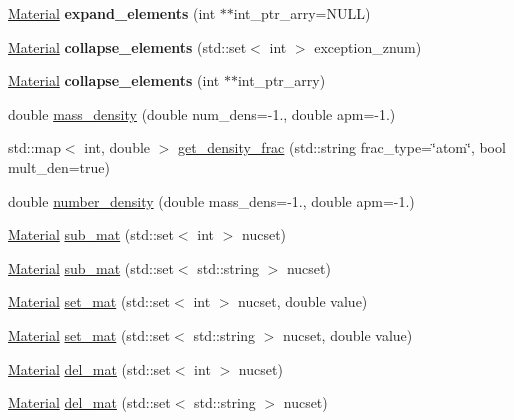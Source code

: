 \begin{DoxyCompactItemize}
\hyperlink{classpyne_1_1_material}{Material} {\bfseries expand\+\_\+elements} (int $\ast$$\ast$int\+\_\+ptr\+\_\+arry=N\+U\+LL)
\item 
\mbox{\label{classpyne_1_1_material_a87cce5b3c63e3f74c3193db856727a8c}} 
\hyperlink{classpyne_1_1_material}{Material} {\bfseries collapse\+\_\+elements} (std\+::set$<$ int $>$ exception\+\_\+znum)
\item 
\mbox{\label{classpyne_1_1_material_a58a9f43215bc0c4b826e234b2959a941}} 
\hyperlink{classpyne_1_1_material}{Material} {\bfseries collapse\+\_\+elements} (int $\ast$$\ast$int\+\_\+ptr\+\_\+arry)
\item 
double \hyperlink{classpyne_1_1_material_ac5bbc836d8b9042297444c51506b7439}{mass\+\_\+density} (double num\+\_\+dens=-\/1., double apm=-\/1.)
\item 
std\+::map$<$ int, double $>$ \hyperlink{classpyne_1_1_material_ad3e2be3a9cc2582c91d694d24e2e44bf}{get\+\_\+density\+\_\+frac} (std\+::string frac\+\_\+type=\char`\"{}atom\char`\"{}, bool mult\+\_\+den=true)
\item 
double \hyperlink{classpyne_1_1_material_a25bb43110ee9bd275cbe534c95713acc}{number\+\_\+density} (double mass\+\_\+dens=-\/1., double apm=-\/1.)
\item 
\hyperlink{classpyne_1_1_material}{Material} \hyperlink{classpyne_1_1_material_a50c2deb6e8513bfb101c5b2992e7f5dc}{sub\+\_\+mat} (std\+::set$<$ int $>$ nucset)
\item 
\hyperlink{classpyne_1_1_material}{Material} \hyperlink{classpyne_1_1_material_a7cd9de1e2a7a80b5beb4946667823b68}{sub\+\_\+mat} (std\+::set$<$ std\+::string $>$ nucset)
\item 
\hyperlink{classpyne_1_1_material}{Material} \hyperlink{classpyne_1_1_material_a17530f493ed5ba0d7f6e9e46c3a49744}{set\+\_\+mat} (std\+::set$<$ int $>$ nucset, double value)
\item 
\hyperlink{classpyne_1_1_material}{Material} \hyperlink{classpyne_1_1_material_a878002d7dfce0dd5a2ed518c6afc6b10}{set\+\_\+mat} (std\+::set$<$ std\+::string $>$ nucset, double value)
\item 
\hyperlink{classpyne_1_1_material}{Material} \hyperlink{classpyne_1_1_material_a34944c4d3c0627ea41d5c7631d080094}{del\+\_\+mat} (std\+::set$<$ int $>$ nucset)
\item 
\hyperlink{classpyne_1_1_material}{Material} \hyperlink{classpyne_1_1_material_a3989e723460e0acffb37163a7f7002c0}{del\+\_\+mat} (std\+::set$<$ std\+::string $>$ nucset)

\end{DoxyCompactItemize}

